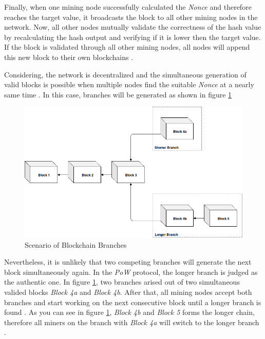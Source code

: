 Finally, when one mining node successfully calculated the \textit{Nonce} and therefore reaches the target value, 
it broadcasts the block to all other mining nodes in the network. Now, all other nodes mutually validate the correctness of the hash value
by recalculating the hash output and verifying if it is lower then the target value. 
If the block is validated through all other mining nodes, all nodes will append this new block to their own blockchains .  

Considering, the network is decentralized and the simultaneous generation of valid blocks is possible when multiple nodes find 
the suitable \textit{Nonce} at a nearly same time . In this case, branches will be generated as shown in figure \ref{figure:blockchain_branches}

\begin{figure}[htbp]
	\centering
	\includegraphics[width=.9\linewidth]{./figures/blockchain_branches.png}
	\caption{Scenario of Blockchain Branches}
	\label{figure:blockchain_branches}
\end{figure}

Nevertheless, it is unlikely that two competing branches will generate the next block simultaneously again. 
In the \textit{PoW} protocol, the longer branch is judged as the authentic one. 
In figure \ref{figure:blockchain_branches}, two branches arised out of 
two simultaneous valided blocks \textit{Block 4a} and \textit{Block 4b}. 
After that, all mining nodes accept both branches and start working on 
the next consecutive block until a longer branch is found . 
As you can see in figure \ref{figure:blockchain_branches}, \textit{Block 4b} and \textit{Block 5} forms the longer 
chain, therefore all miners on the branch with \textit{Block 4a} will switch to 
the longer branch . 

